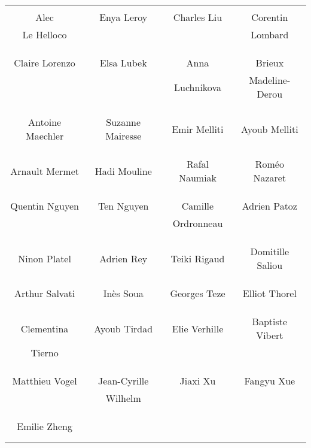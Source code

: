 \begin{center}
\begin{tabular}{cccc}
&&& \\
Alec & Enya Leroy & Charles Liu & Corentin \\ Le Helloco & & & Lombard \\ \\ \\ 

&&& \\
Claire Lorenzo & Elsa Lubek & Anna & Brieux \\ & & Luchnikova & Madeline-Derou \\ \\ \\ 

&&& \\
Antoine Maechler & Suzanne Mairesse & Emir Melliti & Ayoub Melliti \\ \\ \\ 

&&& \\
Arnault Mermet & Hadi Mouline & Rafal Naumiak & Roméo Nazaret \\ \\ \\ 

&&& \\
Quentin Nguyen & Ten Nguyen & Camille & Adrien Patoz \\ & & Ordronneau &  \\ \\ \\ 

&&& \\
Ninon Platel & Adrien Rey & Teiki Rigaud & Domitille Saliou \\ \\ \\

&&& \\
Arthur Salvati & Inès Soua & Georges Teze & Elliot Thorel \\ \\ \\ 

&&& \\
Clementina & Ayoub Tirdad & Elie Verhille & Baptiste Vibert \\ Tierno \\ \\ \\ 

&&& \\
Matthieu Vogel & Jean-Cyrille & Jiaxi Xu & Fangyu Xue \\ & Wilhelm & &\\ \\ \\ 

 \\
Emilie Zheng  \\ \\ \\ 

\end{tabular}
\end{center}
